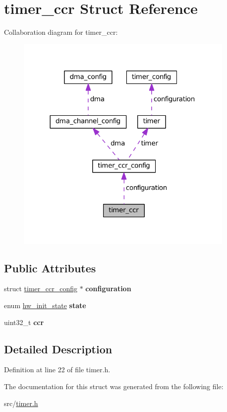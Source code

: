 \hypertarget{structtimer__ccr}{}\section{timer\+\_\+ccr Struct Reference}
\label{structtimer__ccr}


Collaboration diagram for timer\+\_\+ccr\+:\nopagebreak
\begin{figure}[H]
\begin{center}
\leavevmode
\includegraphics[width=300pt]{structtimer__ccr__coll__graph}
\end{center}
\end{figure}
\subsection*{Public Attributes}
\begin{DoxyCompactItemize}
\item 
\hypertarget{structtimer__ccr_ae53385b34f3535fa8cc732edc5fccc28}{}struct \hyperlink{structtimer__ccr__config}{timer\+\_\+ccr\+\_\+config} $\ast$ {\bfseries configuration}\label{structtimer__ccr_ae53385b34f3535fa8cc732edc5fccc28}

\item 
\hypertarget{structtimer__ccr_addba2954b9a68f87a1e716a65095c6a9}{}enum \hyperlink{hw_8h_a3c02952100e7d051b77cdf060ca0ba9b}{hw\+\_\+init\+\_\+state} {\bfseries state}\label{structtimer__ccr_addba2954b9a68f87a1e716a65095c6a9}

\item 
\hypertarget{structtimer__ccr_a60cdc480531c921c61c6192afff7a0dd}{}uint32\+\_\+t {\bfseries ccr}\label{structtimer__ccr_a60cdc480531c921c61c6192afff7a0dd}

\end{DoxyCompactItemize}


\subsection{Detailed Description}


Definition at line 22 of file timer.\+h.



The documentation for this struct was generated from the following file\+:\begin{DoxyCompactItemize}
\item 
src/\hyperlink{timer_8h}{timer.\+h}\end{DoxyCompactItemize}
